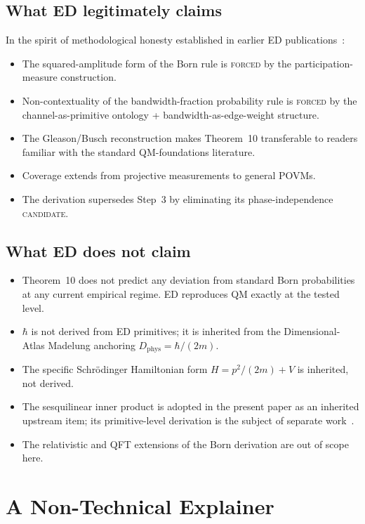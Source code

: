\documentclass[11pt,a4paper]{article}
\begin{document}
\subsection{What ED legitimately claims}

In the spirit of methodological honesty established in earlier ED publications~\cite{arcr,arcq}:

\begin{itemize}
  \item The squared-amplitude form of the Born rule is \textsc{forced} by the participation-measure construction.
  \item Non-contextuality of the bandwidth-fraction probability rule is \textsc{forced} by the channel-as-primitive ontology + bandwidth-as-edge-weight structure.
  \item The Gleason/Busch reconstruction makes Theorem~10 transferable to readers familiar with the standard QM-foundations literature.
  \item Coverage extends from projective measurements to general POVMs.
  \item The derivation supersedes Step~3 by eliminating its phase-independence \textsc{candidate}.
\end{itemize}

\subsection{What ED does not claim}

\begin{itemize}
  \item Theorem~10 does not predict any deviation from standard Born probabilities at any current empirical regime. ED reproduces QM exactly at the tested level.
  \item $\hbar$ is not derived from ED primitives; it is inherited from the Dimensional-Atlas Madelung anchoring $D_\mathrm{phys} = \hbar / (2m)$.
  \item The specific Schr\"odinger Hamiltonian form $H = p^2/(2m) + V$ is inherited, not derived.
  \item The sesquilinear inner product is adopted in the present paper as an inherited upstream item; its primitive-level derivation is the subject of separate work~\cite{u2discrete,u2continuum}.
  \item The relativistic and QFT extensions of the Born derivation are out of scope here.
\end{itemize}

\section{A Non-Technical Explainer}\label{sec:explainer}
\end{document}
